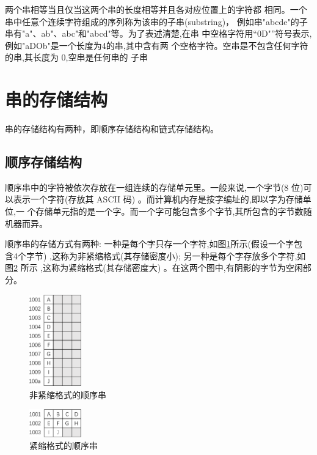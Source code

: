 \documentclass[lang=cn,newtx,10pt,scheme=chinese]{elegantbook}
\begin{document}
两个串相等当且仅当这两个串的长度相等并且各对应位置上的字符都
相同。一个串中任意个连续字符组成的序列称为该串的子串(substring)，
例如串"abcde"的子串有"a"、ab"、abc"和"abcd"等。为了表述清楚,在串
中空格字符用“0D"”符号表示,例如"aDOb"是一个长度为4的串,其中含有两
个空格字符。空串是不包含任何字符的串,其长度为 0,空串是任何串的
子串


\section{串的存储结构}

串的存储结构有两种，即顺序存储结构和链式存储结构。
\subsection{顺序存储结构}


顺序串中的字符被依次存放在一组连续的存储单元里。一般来说,一个字节(8 位)可
以表示一个字符(存放其 ASCII 码) 。而计算机内存是按字编址的,即以字为存储单位,一
个存储单元指的是一个字。而一个字可能包含多个字节,其所包含的字节数随机器而异。

顺序串的存储方式有两种: 一种是每个字只存一个字符,如图\ref{fig:seqString}所示(假设一个字包
含4个字节) ,这称为非紧缩格式(其存储密度小); 另一种是每个字存放多个字符,如图\ref{fig:tightSeqString}
所示 ,这称为紧缩格式(其存储密度大) 。在这两个图中,有阴影的字节为空闲部分。



\begin{figure}[h]
  \centering
  \includegraphics[width=0.2\textwidth]{./figure/pdf/cropped/narrowString.pdf}
  \caption{非紧缩格式的顺序串}
  \label{fig:seqString}
\end{figure}


\begin{figure}[h]
  \centering
  \includegraphics[width=0.2\textwidth]{./figure/pdf/cropped/notNarrowString.pdf}
  \caption{紧缩格式的顺序串}
  \label{fig:tightSeqString}
\end{figure}
\end{document}
